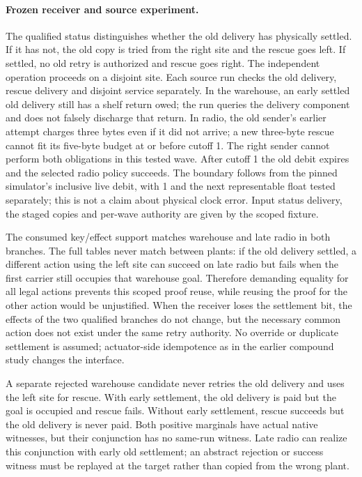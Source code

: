 \documentclass[11pt]{article}
\begin{document}
\paragraph{Frozen receiver and source experiment.}
The qualified status distinguishes whether the old delivery has
physically settled. If it has not, the old copy is tried from the right
site and the rescue goes left. If settled, no old retry is authorized and
rescue goes right. The independent operation proceeds on a disjoint site.
Each source run checks the old delivery, rescue delivery and disjoint
service separately. In the warehouse, an early settled old delivery
still has a shelf return owed; the run queries the delivery component and
does not falsely discharge that return. In radio, the old sender's
earlier attempt charges three bytes even if it did not arrive; a new
three-byte rescue cannot fit its five-byte budget at or before cutoff 1.
The right sender cannot perform both obligations in this tested wave.
After cutoff 1 the old debit expires and the selected radio policy
succeeds. The boundary follows from the pinned simulator's inclusive
live debit, with 1 and the next representable float tested separately;
this is not a claim about physical clock error. Input status delivery,
the staged copies and per-wave authority are given by the scoped fixture.

The consumed key/effect support matches warehouse and late radio in both
branches. The full tables never match between plants: if the old delivery
settled, a different action using the left site can succeed on late radio
but fails when the first carrier still occupies that warehouse goal.
Therefore demanding equality for all legal actions prevents this scoped
proof reuse, while reusing the proof for the other action would be
unjustified. When the receiver loses the settlement bit, the effects of
the two qualified branches do not change, but the necessary common action
does not exist under the same retry authority. No override or duplicate
settlement is assumed; actuator-side idempotence as in the earlier
compound study changes the interface.

A separate rejected warehouse candidate never retries the old delivery
and uses the left site for rescue. With early settlement, the old
delivery is paid but the goal is occupied and rescue fails. Without early
settlement, rescue succeeds but the old delivery is never paid. Both
positive marginals have actual native witnesses, but their conjunction
has no same-run witness. Late radio can realize this conjunction with
early old settlement; an abstract rejection or success witness must be
replayed at the target rather than copied from the wrong plant.
\end{document}
